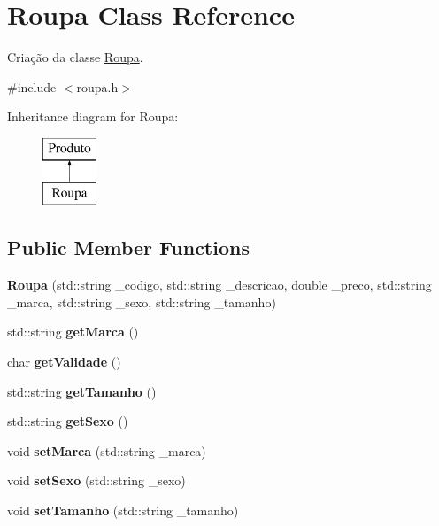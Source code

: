 \hypertarget{classRoupa}{}\section{Roupa Class Reference}
\label{classRoupa}


Criação da classe \mbox{\hyperlink{classRoupa}{Roupa}}.  




{\ttfamily \#include $<$roupa.\+h$>$}

Inheritance diagram for Roupa\+:\begin{figure}[H]
\begin{center}
\leavevmode
\includegraphics[height=2.000000cm]{classRoupa}
\end{center}
\end{figure}
\subsection*{Public Member Functions}
\begin{DoxyCompactItemize}
\item 
\mbox{\label{classRoupa_a45c2f3690526dba425546f0b6d96a14d}} 
{\bfseries Roupa} (std\+::string \+\_\+codigo, std\+::string \+\_\+descricao, double \+\_\+preco, std\+::string \+\_\+marca, std\+::string \+\_\+sexo, std\+::string \+\_\+tamanho)
\item 
\mbox{\label{classRoupa_a627cb05c4d7401b97bae9902b6fcbff8}} 
std\+::string {\bfseries get\+Marca} ()
\item 
\mbox{\label{classRoupa_aef15096c554751e92045fc8acc257f18}} 
char {\bfseries get\+Validade} ()
\item 
\mbox{\label{classRoupa_a6d3eb3fbbf40c0e12831ebebd3210ef0}} 
std\+::string {\bfseries get\+Tamanho} ()
\item 
\mbox{\label{classRoupa_ac9fe45d8a8b73d28c15653ab8e8acdbb}} 
std\+::string {\bfseries get\+Sexo} ()
\item 
\mbox{\label{classRoupa_a779827a9b55aa33229413fa441f45ab7}} 
void {\bfseries set\+Marca} (std\+::string \+\_\+marca)
\item 
\mbox{\label{classRoupa_af34fb921628fbe9f26174699dd1748b2}} 
void {\bfseries set\+Sexo} (std\+::string \+\_\+sexo)
\item 
\mbox{\label{classRoupa_ab5541947bc4fde1925422eab8cc6b190}} 
void {\bfseries set\+Tamanho} (std\+::string \+\_\+tamanho)
\end{DoxyCompactItemize}
